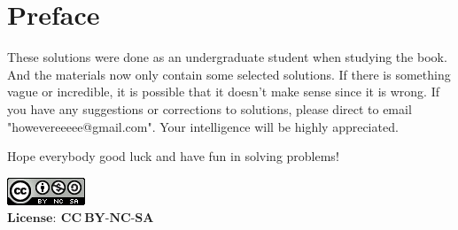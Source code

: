 \graphicspath{ {license/} }

\newpage
\chapter*{Preface}
These solutions were done as an undergraduate student when studying the book. And the materials now only contain some selected solutions. If there is something vague or incredible, it is possible that it doesn't make sense since it is wrong. If you have any suggestions or corrections to solutions, please direct to email "howevereeeee@gmail.com". Your intelligence will be highly appreciated.

Hope everybody good luck and have fun in solving problems!

\vspace{11cm}

\includegraphics[scale=1.5]{CC_BY-NC-SA} \\
$\mathbf{License:\ CC\ BY\text{-}NC\text{-}SA}$